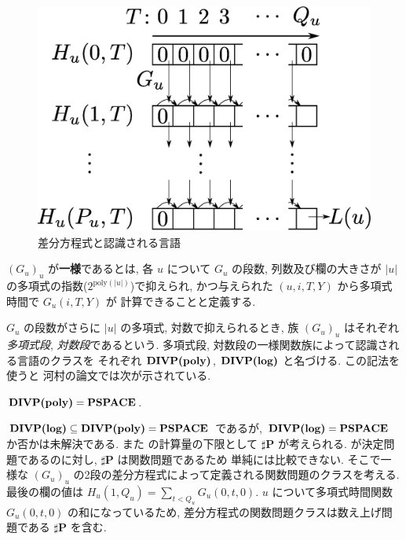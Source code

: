  \begin{figure}
  \label{fig:divp}
  \begin{center}
   \includegraphics[height=0.2\textheight]{image/divp.eps}
  \end{center}
  \caption{差分方程式と認識される言語}
 \end{figure}

$(G_u)_u$ が{\bf 一様}であるとは,
各 $u$ について $G _u$ の段数, 列数及び欄の大きさが $|u|$ の多項式の指数($2^{\mathrm{poly} (|u|)}$)で抑えられ, 
かつ与えられた $(u, i, T, Y)$ から多項式時間で $G_u(i, T, Y)$ が
計算できることと定義する.

$G_u$ の段数がさらに $|u|$ の多項式, 対数で抑えられるとき, 
族 $(G_u) _u$ はそれぞれ\emph{多項式段}, \emph{対数段}であるという. 
多項式段, 対数段の一様関数族によって認識される言語のクラスを
それぞれ $\text{\bf DIVP(poly)}$, $\text{\bf DIVP(log)}$ と名づける.
この記法を使うと
河村の論文では次が示されている.

 \begin{lemma}
  \label{WeakFeedback}
  $\text{\bf DIVP(poly)} = {\bf PSPACE}$.
 \end{lemma}

 $\text{\bf DIVP(log)} \subseteq \text{\bf DIVP(poly)} = {\bf PSPACE}$ であるが, 
 $\text{\bf DIVP(log)} = {\bf PSPACE}$ か否かは未解決である.
 また \DIVPlog の計算量の下限として $\sharp${\bf P} が考えられる.
 \DIVPlog が決定問題であるのに対し, $\sharp${\bf P} は関数問題であるため
 単純には比較できない.
 そこで一様な $(G_u)_u$ の2段の差分方程式によって定義される関数問題のクラスを考える.
 最後の欄の値は $H_u(1, Q_u) = \sum_{t < Q_u} G_u(0, t, 0)$.
 $u$ について多項式時間関数 $G_u(0, t, 0)$ の和になっているため,
 差分方程式の関数問題クラスは数え上げ問題である $\sharp${\bf P} を含む.
